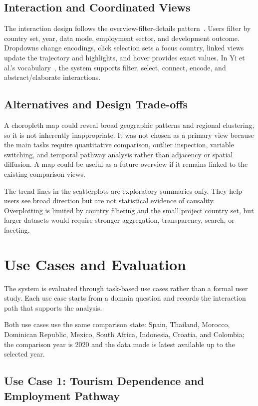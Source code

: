 \documentclass{vgtc}
\begin{document}
\subsection{Interaction and Coordinated Views}

The interaction design follows the overview-filter-details pattern~\cite{shneiderman1996}. Users filter by country set, year, data mode, employment sector, and development outcome. Dropdowns change encodings, click selection sets a focus country, linked views update the trajectory and highlights, and hover provides exact values. In Yi et al.'s vocabulary~\cite{yi2007}, the system supports filter, select, connect, encode, and abstract/elaborate interactions.

\subsection{Alternatives and Design Trade-offs}

A choropleth map could reveal broad geographic patterns and regional clustering, so it is not inherently inappropriate. It was not chosen as a primary view because the main tasks require quantitative comparison, outlier inspection, variable switching, and temporal pathway analysis rather than adjacency or spatial diffusion. A map could be useful as a future overview if it remains linked to the existing comparison views.

The trend lines in the scatterplots are exploratory summaries only. They help users see broad direction but are not statistical evidence of causality. Overplotting is limited by country filtering and the small project country set, but larger datasets would require stronger aggregation, transparency, search, or faceting.

\section{Use Cases and Evaluation}

The system is evaluated through task-based use cases rather than a formal user study. Each use case starts from a domain question and records the interaction path that supports the analysis.

Both use cases use the same comparison state: Spain, Thailand, Morocco, Dominican Republic, Mexico, South Africa, Indonesia, Croatia, and Colombia; the comparison year is 2020 and the data mode is latest available up to the selected year.

\subsection{Use Case 1: Tourism Dependence and Employment Pathway}
\end{document}
